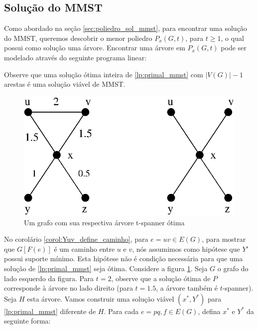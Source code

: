\documentclass[11pt,reqno]{amsart}
\begin{document}
\subsection{Solução do MMST}
Como abordado na seção \ref{sec:poliedro_sol_mmst}, para encontrar uma solução do MMST, 
queremos descobrir o menor poliedro $P_x(G,t)$, para $t \ge 1$, o qual possui como 
solução uma árvore. Encontrar uma árvore em $P_x(G,t)$ pode ser modelado através do 
seguinte programa linear:

\begin{lpformulation}[(P)]
\end{lpformulation}
Observe que uma solução ótima inteira de \ref{lp:primal_mmst} com $|V(G)| - 1$ arestas 
é uma solução viável de MMST.

\begin{figure}[t] 
\centering
\includegraphics[scale=0.45]{figuras/exemplo_Y_minimal}
\caption{Um grafo com sua respectiva árvore t-spanner ótima}
\label{fig:exemplo_Y_minimal}
\end{figure}

No corolário \ref{corol:Yuv_define_caminho}, para $e = uv \in E(G)$, 
para mostrar que $G[F(e)]$ 
é um caminho entre $u$ e $v$, nós assumimos como hipótese que $Y'$ possui 
suporte mínimo. Esta hipótese não é condição necessária para que uma solução 
de \ref{lp:primal_mmst} seja ótima.
Considere a figura \ref{fig:exemplo_Y_minimal}. Seja $G$ o grafo do lado 
esquerdo da figura. Para $t = 2$, observe que a solução ótima de $P$ 
corresponde à árvore no lado direito (para $t = 1.5$, a árvore também é 
$t$-spanner). 
Seja $H$ esta árvore. Vamos 
construir uma solução viável $(x^*,Y^*)$ para \ref{lp:primal_mmst} diferente de 
$H$. Para cada $e=pq, f \in E(G)$, defina $x^*$ e $Y^*$ da seguinte forma: 
\end{document}
